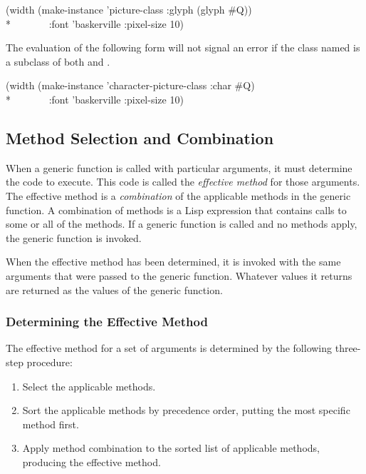 \begin{lisp}
(width (make-instance 'picture-class :glyph (glyph \#{\Xbackslash}Q)) \\*
~~~~~~~:font 'baskerville :pixel-size 10)
\end{lisp}

The evaluation of the following form will not signal an error
if the class named  is a subclass of
both  and .

\begin{lisp}
(width (make-instance 'character-picture-class :char \#{\Xbackslash}Q) \\*
~~~~~~~:font 'baskerville :pixel-size 10)
\end{lisp}


\subsection{Method Selection and Combination}
\label{Method-Selection-and-Combination-SECTION}

When a generic function is called with particular arguments, it must
determine the code to execute.  This code is called the \emph{effective
method\/} for those arguments.  The effective method is a \emph{
combination\/} of the applicable methods in the generic function.  A
combination of methods is a Lisp expression that contains calls to some or
all of the methods.  If a generic function is
called and no methods apply, the generic function 
 is invoked.

When the effective method has been determined, it is invoked with the same
arguments that were passed to the generic function.  Whatever values it
returns are returned as the values of the generic function.

\subsubsection{Determining the Effective Method}
\label{Determining-the-Effective-Method-SECTION}

The effective method for a set of
arguments is determined by the following three-step procedure:

\begin{enumerate}

\item Select the applicable methods.

\item Sort the applicable methods by precedence order, putting
the most specific method first.

\item Apply method combination to the sorted list of
applicable methods, producing the effective method.

\end{enumerate}

